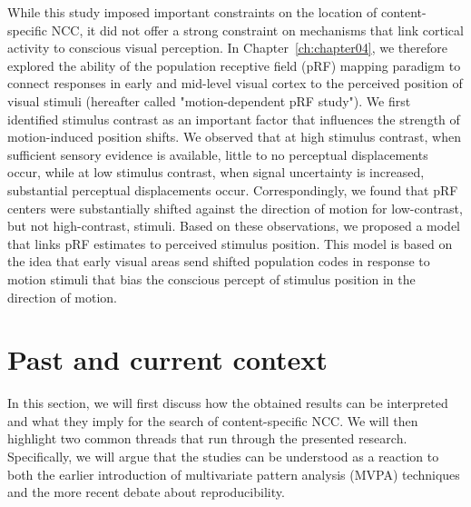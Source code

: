 While this study imposed important constraints on the location of content-specific NCC, it did not offer a strong constraint on mechanisms that link cortical activity to conscious visual perception. In Chapter~\ref{ch:chapter04}, we therefore explored the ability of the population receptive field (pRF) mapping paradigm to connect responses in early and mid-level visual cortex to the perceived position of visual stimuli (hereafter called "motion-dependent pRF study"). We first identified stimulus contrast as an important factor that influences the strength of motion-induced position shifts. We observed that at high stimulus contrast, when sufficient sensory evidence is available, little to no perceptual displacements occur, while at low stimulus contrast, when signal uncertainty is increased, substantial perceptual displacements occur. Correspondingly, we found that pRF centers were substantially shifted against the direction of motion for low-contrast, but not high-contrast, stimuli. Based on these observations, we proposed a model that links pRF estimates to perceived stimulus position. This model is based on the idea that early visual areas send shifted population codes in response to motion stimuli that bias the conscious percept of stimulus position in the direction of motion.

\section{Past and current context}
In this section, we will first discuss how the obtained results can be interpreted and what they imply for the search of content-specific NCC. We will then highlight two common threads that run through the presented research. Specifically, we will argue that the studies can be understood as a reaction to both the earlier introduction of multivariate pattern analysis (MVPA) techniques and the more recent debate about reproducibility.

